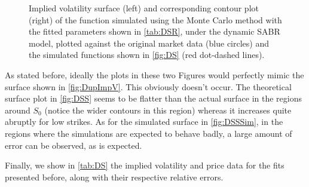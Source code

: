 \begin{figure}[H]
  \begin{subfigmatrix}{2}
  \end{subfigmatrix}
    \caption[Implied volatility surface and corresponding contour plot of the function simulated using the Monte Carlo method with the fitted parameters shown in \autoref{tab:DSR}, under the dynamic SABR model, plotted against the original market data and the simulated functions shown in \autoref{fig:DS}.]{Implied volatility surface (left) and corresponding contour plot (right) of the function simulated using the Monte Carlo method with the fitted parameters shown in \autoref{tab:DSR}, under the dynamic SABR model, plotted against the original market data (blue circles) and the simulated functions shown in \autoref{fig:DS} (red dot-dashed lines).}\label{fig:DSSSim}
\end{figure} 


As stated before, ideally the plots in these two Figures would perfectly mimic the surface shown in \autoref{fig:DupImpV}. This obviously doesn't occur. The theoretical surface plot in \autoref{fig:DSS} seems to be flatter than the actual surface in the regions around $S_0$ (notice the wider contours in this region) whereas it increases quite abruptly for low strikes.
As for the simulated surface in \autoref{fig:DSSSim}, in the regions where the simulations are expected to behave badly, a large amount of error can be observed, as is expected.


Finally, we show in \autoref{tab:DS} the implied volatility and price data for the fits presented before, along with their respective relative errors.

